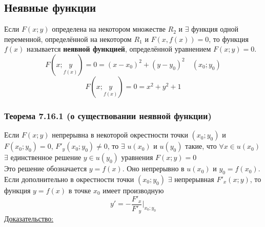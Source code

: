 \documentclass[12pt]{article}
\begin{document}
    \subsection{Неявные функции}
    Если $F(x;y)$ определена на некотором множестве $R_2$ и $\exists$ функция одной переменной, определённой на некотором $R_1$ и $F(x, f(x)) = 0$, то функция $f(x)$ называется \textbf{неявной функцией}, определённой уравнением $F(x;y) = 0$.
    \[ F(x;\underset{f(x)}{y}) = 0 = (x-x_0)^2 + (y-y_0)^2 \quad (x_0; y_0) \]
    \[ F(x;\underset{f(x)}{y}) = 0 = x^2 + y^2 + 1 \]
    \subsubsection*{Теорема 7.16.1 (о существовании неявной функции)}\label{th:7.16.1}
    Если $F(x;y)$ непрерывна в некоторой окрестности точки $(x_0; y_0)$ и $F(x_0; y_0) = 0$, $F'_y(x_0; y_0) \ne 0$, то $\exists$ $u(x_0)$ и $u(y_0)$ такие, что $\forall x \in u(x_0)$ $\exists$ единственное решение $y \in u(y_0)$ уравнения $F(x;y) = 0$\\
    Это решение обозначается $y = f(x)$. Оно непрерывно в $u(x_0)$ и $y_0 = f(x_0)$.\\
    Если дополнительно в окрестности точки $(x_0; y_0)$ $\exists$ непрерывная $F'_x(x; y)$, то функция $y = f(x)$ в точке $x_0$ имеет производную
    \[ \boxed{ y' = -\frac{F'_x}{F'_y} \Big|_{x_0; y_0} } \]
    \underline{Доказательство:}
\end{document}
